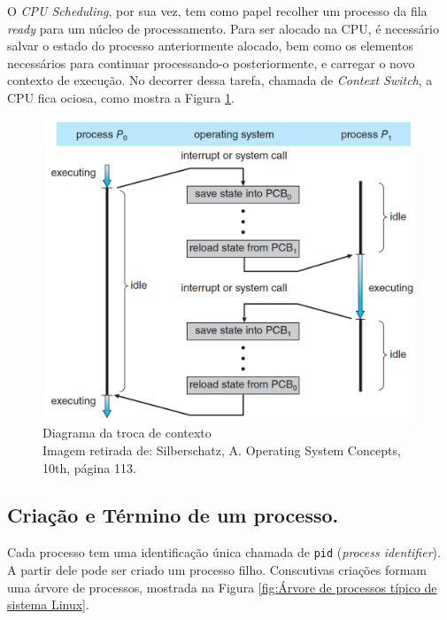 O \emph{CPU Scheduling}, por sua vez, tem como papel recolher um
processo da fila \emph{ready} para um núcleo de processamento. Para ser
alocado na CPU, é necessário salvar o estado do processo anteriormente
alocado, bem como os elementos necessários para continuar processando-o
posteriormente, e carregar o novo contexto de execução. No decorrer
dessa tarefa, chamada de \emph{Context Switch}, a CPU fica ociosa, como
mostra a Figura \ref{fig:Diagrama da troca de contexto}.

\begin{figure}[h]
\centering
\includegraphics[keepaspectratio, width=12cm, height=9cm]{imagens/05/05 - Diagrama Contex Switch.png}
\caption{Diagrama da troca de contexto   \\
Imagem retirada de: Silberschatz, A. Operating System Concepts, 10th,
página 113. \\}
\label{fig:Diagrama da troca de contexto}
\end{figure}


\hypertarget{criauxe7uxe3o-e-tuxe9rmino-de-um-processo.}{%
\subsection{Criação e Término de um
processo.}\label{criauxe7uxe3o-e-tuxe9rmino-de-um-processo.}}

Cada processo tem uma identificação única chamada de \texttt{pid}
(\emph{process identifier}). A partir dele pode ser criado um processo
filho. Conscutivas criações formam uma árvore de processos, mostrada na
Figura \ref{fig:Árvore de processos típico de sistema Linux}.


